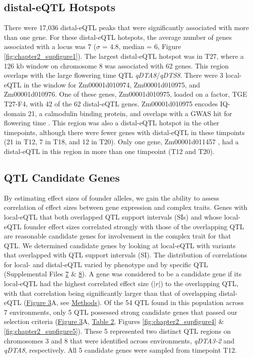 \documentclass[article,9pt,twocolumn,twoside]{rilabRxiv}
\begin{document}
\subsection{distal-eQTL Hotspots}
There were 17,036 distal-eQTL peaks that were significantly associated with more than one gene.
For these distal-eQTL hotspots, the average number of genes associated with a locus was 7 ($\sigma$ = 4.8, median = 6, Figure \ref{fig:chapter2_supfigure1}).
The largest distal-eQTL hotspot was in T27, where a 126 kb window on chromosome 8 was associated with 62 genes.
This region overlaps with the large flowering time QTL \textit{qDTA8}/\textit{qDTS8}.
There were 3 local-eQTL in the window for Zm00001d010974, Zm00001d010975, and Zm00001d010976.
One of these genes, Zm00001d010975, loaded on a factor, TGE T27-F4, with 42 of the 62 distal-eQTL genes.
Zm00001d010975 encodes IQ-domain 21, a calmodulin binding protein, and overlaps with a GWAS hit for flowering time \citep{vanInghelandt}.
This region was also a distal-eQTL hotspot in the other timepoints, although there were fewer genes with distal-eQTL in these timpoints (21 in T12, 7 in T18, and 12 in T20).
Only one gene, Zm00001d011457 , had a distal-eQTL in this region in more than one timpeoint (T12 and T20).
\subsection{QTL Candidate Genes}
By estimating effect sizes of founder alleles, we gain the ability to assess correlation of effect sizes between gene expression and complex traits.
Genes with local-eQTL that both overlapped QTL support intervals (SIs) and whose local-eQTL founder effect sizes correlated strongly with those of the overlapping QTL are reasonable candidate genes for involvement in the complex trait for that QTL.
We determined candidate genes by looking at local-eQTL with variants that overlapped with QTL support intervals (SI).
The distribution of correlations for local- and distal-eQTL varied by phenotype and by specific QTL (Supplemental Files \href{run:./figures/local_distal_r_density.pdf}{7} \& \href{run:./figures/local_distal_r_hist.pdf}{8}).
A gene was considered to be a candidate gene if its local-eQTL had the highest correlated effect size ($|r|$) to the overlapping QTL, with that correlation being significantly larger than that of overlapping distal-eQTL (\hyperref[fig:candidates]{Figure 3}A, see \hyperref[sec:materials:methods]{Methods}).
Of the 54 QTL found in this population across 7 environments, only 5 QTL possessed strong candidate genes that passed our selection criteria (\hyperref[fig:candidates]{Figure 3}A, \hyperref[tab:candtable]{Table 2}, Figures \ref{fig:chapter2_supfigure4} \& \ref{fig:chapter2_supfigure5}).
These 5 represented two distinct QTL regions on chromosomes 3 and 8 that were identified across environments, \emph{qDTA3-2} and \emph{qDTA8}, respectively.
All 5 candidate genes were sampled from timepoint T12.
\end{document}
